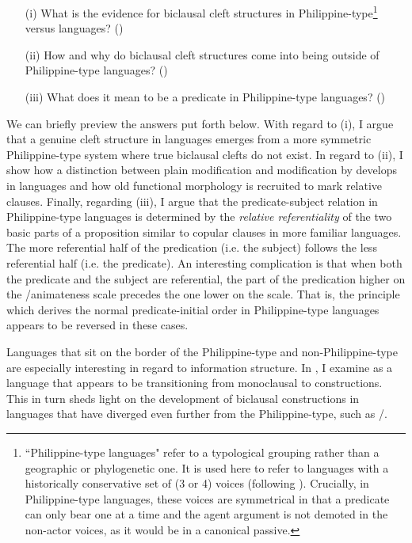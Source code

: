 \documentclass[output=paper]{langsci/langscibook}
\begin{document}
\begin{itemize}
\item[(i)] What is the evidence for biclausal cleft structures in Philippine-type\footnote{``Philippine-type languages" refer to a typological grouping rather than a geographic or phylogenetic one. It is used here to refer to  languages with a historically conservative set of (3 or 4) voices (following \citealt{Blust:2002b}). Crucially, in Philippine-type languages, these voices are symmetrical in that a predicate can only bear one  at a time and the agent argument is not demoted in the non-actor voices, as it would be in a canonical passive.} versus  languages? ()
\item[(ii)] How and why do biclausal cleft structures come into being outside of Philippine-type languages? ()
\item[(iii)] What does it mean to be a predicate in Philippine-type languages? ()
\end{itemize}

\noindent
We can briefly preview the answers put forth below. With regard to (i), I argue that a genuine cleft structure in  languages emerges from a more symmetric Philippine-type system where true biclausal clefts do not exist. In regard to (ii), I show how a distinction between plain modification and modification by  develops in  languages and how old functional morphology is recruited to mark relative clauses. Finally, regarding (iii), I argue that the predicate-subject relation in Philippine-type languages is determined by the \emph{relative referentiality} of the two basic parts of a proposition similar to copular clauses in more familiar languages. The more referential half of the predication (i.e. the subject) follows the less referential half (i.e. the predicate). An interesting complication is that when both the predicate and the subject are referential, the part of the predication higher on the /animateness scale precedes the one lower on the scale. That is, the principle which derives the normal predicate-initial order in Philippine-type languages appears to be reversed in these cases.

Languages that sit on the border of the Philippine-type and non-Philippine-type are especially interesting in regard to information structure. In , I examine  as a language that appears to be transitioning from monoclausal to  constructions. This in turn sheds light on the development of biclausal constructions in languages that have diverged even further from the Philippine-type, such as /. 
\end{document}
